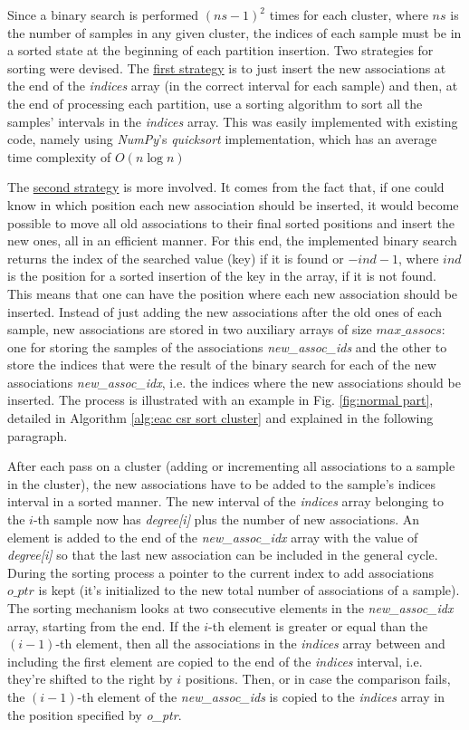 Since a binary search is performed $(ns - 1)^2$ times for each cluster, where $ns$ is the number of samples in any given cluster, the indices of each sample must be in a sorted state at the beginning of each partition insertion.
Two strategies for sorting were devised.
The \underline{first strategy} is to just insert the new associations at the end of the \emph{indices} array (in the correct interval for each sample) and then, at the end of processing each partition, use a sorting algorithm to sort all the samples' intervals in the \emph{indices} array.
This was easily implemented with existing code, namely using \emph{NumPy}'s \emph{quicksort} implementation, which has an average time complexity of $O(n \log n)$

The \underline{second strategy} is more involved.
It comes from the fact that, if one could know in which position each new association should be inserted, it would become possible to move all old associations to their final sorted positions and insert the new ones, all in an efficient manner.
For this end, the implemented binary search returns the index of the searched value (key) if it is found or $-ind -1$, where $ind$ is the position for a sorted insertion of the key in the array, if it is not found.
This means that one can have the position where each new association should be inserted.
Instead of just adding the new associations after the old ones of each sample, new associations are stored in two auxiliary arrays of size $max\_assocs$: one for storing the samples of the associations \emph{new\_assoc\_ids} and the other to store the indices that were the result of the binary search for each of the new associations \emph{new\_assoc\_idx}, i.e. the indices where the new associations should be inserted.
The process is illustrated with an example in Fig. \ref{fig:normal part}, detailed in Algorithm \ref{alg:eac csr sort cluster} and explained in the following paragraph.

After each pass on a cluster (adding or incrementing all associations to a sample in the cluster), the new associations have to be added to the sample's indices interval in a sorted manner.
The new interval of the \emph{indices} array belonging to the $i$-th sample now has \emph{degree[i]} plus the number of new associations.
An element is added to the end of the \emph{new\_assoc\_idx} array with the value of \emph{degree[i]} so that the last new association can be included in the general cycle.
During the sorting process a pointer to the current index to add associations $o\_ptr$ is kept (it's initialized to the new total number of associations of a sample).
The sorting mechanism looks at two consecutive elements in the \emph{new\_assoc\_idx} array, starting from the end.
If the $i$-th element is greater or equal than the $(i-1)$-th element, then all the associations in the \emph{indices} array between and including the first element are copied to the end of the \emph{indices} interval, i.e. they're shifted to the right by $i$ positions.
Then, or in case the comparison fails, the $(i-1)$-th element of the \emph{new\_assoc\_ids} is copied to the \emph{indices} array in the position specified by \emph{o\_ptr}.

